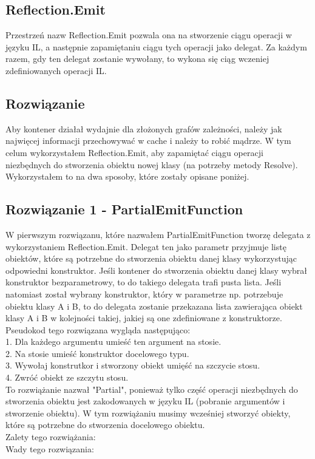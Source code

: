 \documentclass[12pt]{article}
\begin{document}
\subsection{Reflection.Emit}
Przestrzeń nazw Reflection.Emit pozwala ona na stworzenie ciągu operacji w języku IL, a następnie zapamiętaniu ciągu tych operacji jako delegat. Za każdym razem, gdy ten delegat zostanie wywołany, to wykona się ciąg wczeniej zdefiniowanych operacji IL.

\subsection{Rozwiązanie}
Aby kontener działał wydajnie dla złożonych grafów zależności, należy jak najwięcej informacji przechowywać w cache i należy to robić mądrze. W tym celum wykorzystałem Reflection.Emit, aby zapamiętać ciągu operacji niezbędnych do stworzenia obiektu nowej klasy (na potrzeby metody Resolve). Wykorzystałem to na dwa sposoby, które zostały opisane poniżej.

\subsection{Rozwiązanie 1 - PartialEmitFunction}
W pierwszym rozwiązanu, które nazwałem PartialEmitFunction tworzę delegata z wykorzystaniem Reflection.Emit. Delegat ten jako parametr przyjmuje listę obiektów, które są potrzebne do stworzenia obiektu danej klasy wykorzystując odpowiedni konstruktor. Jeśli kontener do stworzenia obiektu danej klasy wybrał konstruktor bezparametrowy, to do takiego delegata trafi pusta lista. Jeśli natomiast został wybrany konstruktor, który w parametrze np. potrzebuje obiektu klasy A i B, to do delegata zostanie przekazana lista zawierająca obiekt klasy A i B w kolejności takiej, jakiej są one zdefiniowane z konstruktorze.\\
Pseudokod tego rozwiązana wygląda następująco:\\
1. Dla każdego argumentu umieść ten argument na stosie.\\
2. Na stosie umieść konstruktor docelowego typu.\\
3. Wywołaj konstrutkor i stworzony obiekt umięść na szczycie stosu.\\
4. Zwróć obiekt ze szczytu stosu.\\
To rozwiążanie nazwał "Partial", ponieważ tylko część operacji niezbędnych do stworzenia obiektu jest zakodowanych w języku IL (pobranie argumentów i stworzenie obiektu). W tym rozwiążaniu musimy wcześniej stworzyć obiekty, które są potrzebne do stworzenia docelowego obiektu.\\
Zalety tego rozwiążania:\\
Wady tego rozwiązania:\\
\end{document}
